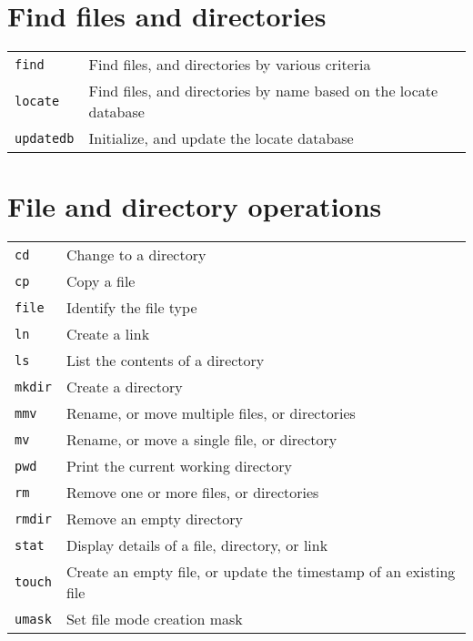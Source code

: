 \documentclass[10pt]{article}
\begin{document}
\begin{multicols}{2}
\section{Find files and directories}
\begin{tabular}{ p{2.5cm} p{8.5cm} }
  \hline
  \texttt{find} & Find files, and directories by various criteria \\
  \texttt{locate} & Find files, and directories by name based on the locate database \\
  \texttt{updatedb} & Initialize, and update the locate database \\
  \hline
\end{tabular}

\columnbreak

\section{File and directory operations}
\begin{tabular}{ p{2.5cm} p{8.5cm} }
  \hline
  \texttt{cd} & Change to a directory \\
  \texttt{cp} & Copy a file \\
  \texttt{file} & Identify the file type \\
  \texttt{ln} & Create a link \\
  \texttt{ls} & List the contents of a directory \\
  \texttt{mkdir} & Create a directory \\
  \texttt{mmv} & Rename, or move multiple files, or directories \\
  \texttt{mv} & Rename, or move a single file, or directory \\
  \texttt{pwd} & Print the current working directory \\
  \texttt{rm} & Remove one or more files, or directories \\
  \texttt{rmdir} & Remove an empty directory \\
  \texttt{stat} & Display details of a file, directory, or link\\
  \texttt{touch} & Create an empty file, or update the timestamp of an existing file \\
  \texttt{umask} & Set file mode creation mask \\
  \hline
\end{tabular}

\vfill


\end{multicols}
\end{document}
